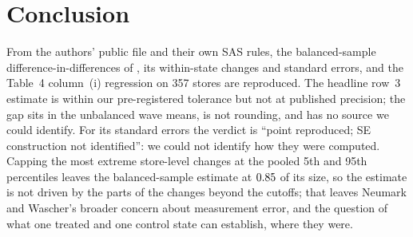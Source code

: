 \documentclass[11pt]{article}
\begin{document}
\section{Conclusion}

From the authors' public file and their own SAS rules, the balanced-sample
difference-in-differences of \citet{card1994minimum}, its within-state changes and standard
errors, and the Table~4 column~(i) regression on 357 stores are reproduced. The headline
row~3 estimate is within our pre-registered tolerance but not at published precision; the
gap sits in the unbalanced wave means, is not rounding, and has no source we could identify.
For its standard errors the verdict is ``point reproduced; SE construction not
identified'': we could not identify how they were computed. Capping the most extreme
store-level changes at the pooled 5th and 95th percentiles leaves the balanced-sample
estimate at $0.85$ of its size, so the estimate is not driven by the parts of the
changes beyond the cutoffs; that leaves Neumark and Wascher's broader concern about measurement error, and
the question of what one treated and one control state can establish, where they were.





\end{document}
